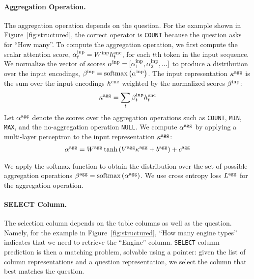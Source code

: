 \documentclass{article} %
\begin{document}
\paragraph{Aggregation Operation.}
%
The aggregation operation depends on the question.
For the example shown in Figure~\ref{fig:structured}, the correct operator is \texttt{COUNT} because the question asks for ``How many''.
To compute the aggregation operation, we first compute the scalar attention score, $\alpha^{\rm inp}_t = W^{\rm inp} h^{\rm enc}_t$, for each $t$th token in the input sequence.
%
We normalize the vector of scores $\alpha^{\rm inp} = [\alpha^{\rm inp}_1, \alpha^{\rm inp}_2, ...]$ to produce a distribution over the input encodings, $\beta^{\rm inp} = {\rm softmax} \left( \alpha^{\rm inp} \right)$.
The input representation $\kappa^{\rm agg}$ is the sum over the input encodings $h^{\rm enc}$ weighted by the normalized scores $\beta^{\rm inp}$:
%
\begin{align}
\label{equation:aggrepr}
\kappa^{\rm agg} = \sum_t \beta^{\rm inp}_t h^{\rm enc}_t
\end{align}
%
Let $\alpha^{\rm agg}$ denote the scores over the aggregation operations such as \texttt{COUNT}, \texttt{MIN}, \texttt{MAX}, and the no-aggregation operation \texttt{NULL}.
We compute $\alpha^{\rm agg}$ by applying a multi-layer perceptron to the input representation $\kappa^{\rm agg}$:
%
\vspace{-4mm}
\begin{align}
\alpha^{\rm agg} = W^{\rm agg} \tanh \left( V^{\rm agg} \kappa^{\rm agg} + b^{\rm agg} \right) + c^{\rm agg}
\end{align}
\vspace{-2mm}

We apply the softmax function to obtain the distribution over the set of possible aggregation operations $\beta^{\rm agg} = {\rm softmax} \left( \alpha^{\rm agg} \right)$.
We use cross entropy loss $L^{\rm agg}$ for the aggregation operation.


\paragraph{SELECT Column.}
%
The selection column depends on the table columns as well as the question.
Namely, for the example in Figure~\ref{fig:structured}, ``How many engine types'' indicates that we need to retrieve the ``Engine'' column.
\texttt{SELECT} column prediction is then a matching problem, solvable using a pointer:
given the list of column representations and a question representation, we select the column that best matches the question.
\end{document}
